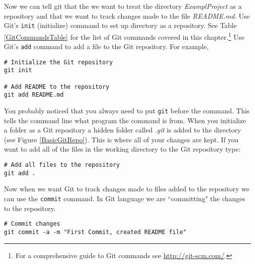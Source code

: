 Now we can tell git that the we want to treat the directory {\emph{ExamplProject}} as a repository and that we want to track changes made to the file {\emph{README.md}}. Use Git's \texttt{init} (initialize) command to set up directory as a repository. See Table \ref{GitCommandsTable} for the list of Git commands covered in this chapter.\footnote{For a comprehensive guide to Git commands see \url{http://git-scm.com/}.} Use Git's \texttt{add} command to add a file to the Git repository. For example, 

\begin{knitrout}
\color{fgcolor}\begin{kframe}
\begin{verbatim}
# Initialize the Git repository
git init

# Add README to the repository
git add README.md
\end{verbatim}
\end{kframe}
\end{knitrout}


\noindent You probably noticed that you always need to put \texttt{git} before the command. This tells the command line what program the command is from. When you initialize a folder as a Git repository a hidden folder called {\emph{.git}} is added to the directory (see Figure \ref{BasicGitRepo}). This is where all of your changes are kept. If you want to add all of the files in the working directory to the Git repository type:

\begin{knitrout}
\color{fgcolor}\begin{kframe}
\begin{verbatim}
# Add all files to the repository
git add .
\end{verbatim}
\end{kframe}
\end{knitrout}


\noindent Now when we want Git to track changes made to files added to the repository we can use the \texttt{commit} command. In Git language we are ``committing" the changes to the repository.

\begin{knitrout}
\color{fgcolor}\begin{kframe}
\begin{verbatim}
# Commit changes
git commit -a -m "First Commit, created README file"
\end{verbatim}
\end{kframe}
\end{knitrout}



